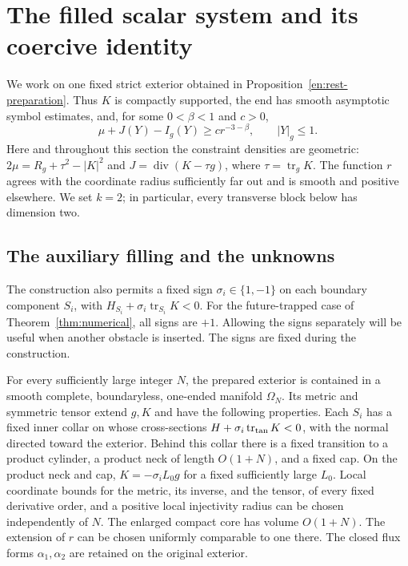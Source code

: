 \section{The filled scalar system and its coercive identity}
\label{sy:section}

We work on one fixed strict exterior obtained in
Proposition~\ref{en:rest-preparation}.  Thus $K$ is compactly supported,
the end has smooth asymptotic symbol estimates, and, for some
$0<\beta<1$ and $c>0$,
\begin{equation}\label{sy:strict-margin}
 \mu+J(Y)-I_g(Y)\ge c r^{-3-\beta},\qquad |Y|_g\le1.
\end{equation}
Here and throughout this section the constraint densities are geometric:
$2\mu=R_g+\tau^2-|K|^2$ and
$J=\operatorname{div}(K-\tau g)$, where $\tau=\operatorname{tr}_gK$.
The function $r$ agrees with the coordinate radius sufficiently far out
and is smooth and positive elsewhere.  We set $k=2$; in particular,
every transverse block below has dimension two.

\subsection{The auxiliary filling and the unknowns}

The construction also permits a fixed sign $\sigma_i\in\{1,-1\}$ on
each boundary component $S_i$, with
$H_{S_i}+\sigma_i\operatorname{tr}_{S_i}K<0$.
For the future-trapped case of Theorem~\ref{thm:numerical}, all signs are $+1$.
Allowing the signs separately will be useful when another obstacle is
inserted.  The signs are fixed during the construction.

\begin{lemma}\label{sy:filled-setup}
For every sufficiently large integer $N$, the prepared exterior is
contained in a smooth complete, boundaryless, one-ended manifold
$\Omega_N$.  Its metric and symmetric tensor extend $g,K$ and have the
following properties.  Each $S_i$ has a fixed inner collar on whose
cross-sections $H+\sigma_i\operatorname{tr}_{\rm tan}K<0$, with the
normal directed toward the exterior.  Behind this collar there is a
fixed transition to a product cylinder, a product neck of length
$O(1+N)$, and a fixed cap.  On the product neck and cap,
$K=-\sigma_iL_0g$ for a fixed sufficiently large $L_0$.
Local coordinate bounds for the metric, its inverse, and the tensor,
of every fixed derivative order, and a positive local injectivity
radius can be chosen independently of $N$.  The enlarged compact core
has volume $O(1+N)$.  The extension of $r$ can be chosen uniformly
comparable to one there.  The closed flux forms $\alpha_1,\alpha_2$
are retained on the original exterior.
\end{lemma}

